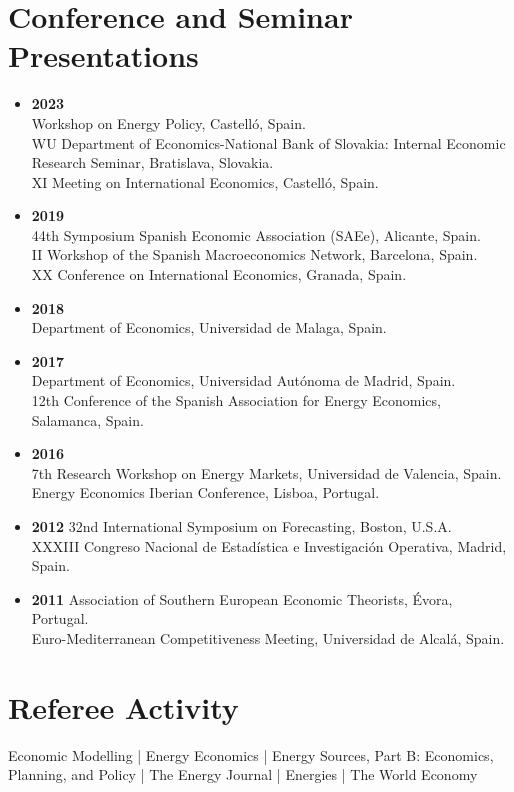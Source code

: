 \documentclass[11pt]{article}\usepackage[]{graphicx}\usepackage[usenames,dvipsnames]{xcolor}
\begin{document}
\section{Conference and Seminar Presentations} 
\begin{itemize}
  \item \textbf{2023}\\
  Workshop on Energy Policy, Castelló, Spain.\\
  WU Department of Economics-National Bank of Slovakia: Internal Economic Research Seminar, Bratislava, Slovakia.\\
  XI Meeting on International Economics, Castelló, Spain.
  \item \textbf{2019}\\
  44th Symposium Spanish Economic Association (SAEe), Alicante, Spain.\\
  II Workshop of the Spanish Macroeconomics Network, Barcelona, Spain.\\
  XX Conference on International Economics, Granada, Spain.
  \item \textbf{2018}\\
  Department of Economics, Universidad de Malaga, Spain.
  \item \textbf{2017}\\
  Department of Economics, Universidad Autónoma de Madrid, Spain.\\
  12th Conference of the Spanish Association for Energy Economics, Salamanca, Spain.
  \item \textbf{2016}\\
  7th Research Workshop on Energy Markets, Universidad de Valencia, Spain.\\
  Energy Economics Iberian Conference, Lisboa, Portugal.
  \item \textbf{2012} 32nd International Symposium on Forecasting, Boston, U.S.A.\\
  XXXIII Congreso Nacional de Estadística e Investigación Operativa, Madrid, Spain.
  \item \textbf{2011} Association of Southern European Economic Theorists, Évora, Portugal.\\
  Euro-Mediterranean Competitiveness Meeting, Universidad de Alcalá, Spain.
\end{itemize}

\section{Referee Activity}
\raggedright
Economic Modelling | Energy Economics | Energy Sources, Part B: Economics, Planning, and Policy | The Energy Journal | Energies | The World Economy\\
\end{document}

